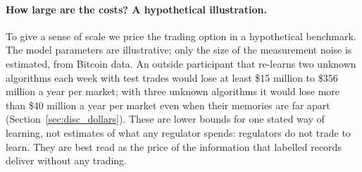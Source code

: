 \documentclass[12pt]{article}
\theoremstyle{definition}
\theoremstyle{remark}
\begin{document}
\paragraph{How large are the costs? A hypothetical illustration.} To give a sense of scale we price the trading option in a hypothetical benchmark. The model parameters are illustrative; only the size of the measurement noise is estimated, from Bitcoin data. An outside participant that re-learns two unknown algorithms each week with test trades would lose at least \$15 million to \$356 million a year per market; with three unknown algorithms it would lose more than \$40 million a year per market even when their memories are far apart (Section~\ref{sec:disc_dollars}). These are lower bounds for one stated way of learning, not estimates of what any regulator spends: regulators do not trade to learn. They are best read as the price of the information that labelled records deliver without any trading.
\end{document}

